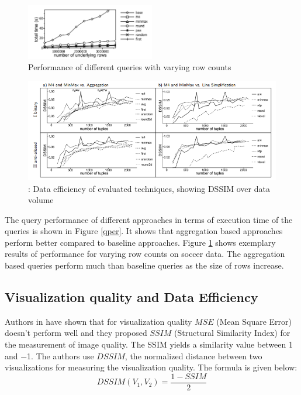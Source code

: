 \begin{figure}
	\includegraphics[width=0.5\textwidth]{pv}
	\caption{Performance of different queries with varying row counts}
	\label{vr}
\end{figure}
\begin{figure}
	\includegraphics[width=\textwidth]{dsim}
	\caption{: Data efficiency of evaluated techniques, showing DSSIM over data volume}
	\label{dsim}
\end{figure}

The query performance of different approaches in terms of execution time of the queries is shown in Figure \ref{qper}. It shows that aggregation based approaches perform better compared to baseline approaches. Figure \ref{vr} shows exemplary results of performance  for varying row counts on soccer data. The aggregation based queries perform much than baseline queries as the size of rows increase. 

\subsection{Visualization quality and Data Efficiency}
Authors in \cite{wang2004image} have shown that for visualization quality $MSE$ (Mean Square Error) doesn't perform well and they proposed $SSIM$ (Structural
Similarity Index) for the measurement of image quality. The SSIM yields a similarity
value between 1 and −1. The authors use $DSSIM$, the normalized distance between two visualizations for measuring the visualization quality. The formula is given below:
\begin{equation}
DSSIM(V_1, V_2) = \frac{1 - SSIM}{2}
\end{equation}


